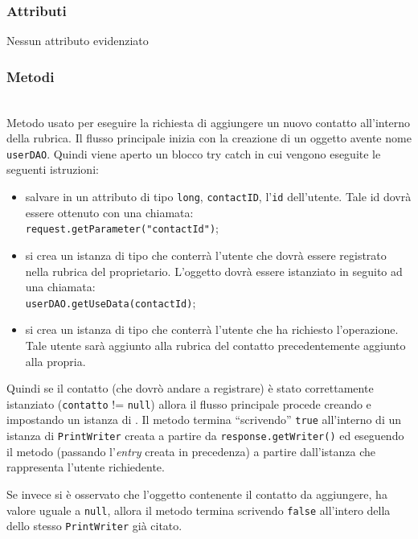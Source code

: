 \subsubsection*{Attributi}

Nessun attributo evidenziato

\subsubsection*{Metodi}
\begin{description}
	\item{}\\	
	Metodo usato per eseguire la richiesta di aggiungere un nuovo contatto all'interno della rubrica. Il flusso principale inizia  con la creazione di un oggetto  avente nome \texttt{userDAO}. Quindi viene aperto un blocco try catch in cui vengono eseguite le seguenti istruzioni:
	\begin{itemize}
		\item salvare in un attributo di tipo \texttt{long}, \texttt{contactID}, l'\texttt{id} dell'utente. Tale id dovrà essere ottenuto con una chiamata:\\
		\verb|request.getParameter("contactId")|;\\
		
		\item si crea un istanza di tipo  che conterrà l'utente che dovrà essere registrato nella rubrica del proprietario. L'oggetto dovrà essere istanziato in seguito ad una chiamata:\\
		\verb|userDAO.getUseData(contactId)|;
		
		\item si crea un istanza di tipo  che conterrà l'utente che ha richiesto l'operazione. Tale utente sarà aggiunto alla rubrica del contatto precedentemente aggiunto alla propria.
	\end{itemize}
	
	Quindi se il contatto (che dovrò andare a registrare) è stato correttamente istanziato (\texttt{contatto} != \texttt{null}) allora il flusso principale procede creando e impostando un istanza di . Il metodo termina ``scrivendo'' \texttt{true} all'interno di un istanza di \texttt{PrintWriter} creata a partire da \texttt{response.getWriter()} ed eseguendo il metodo  (passando l'\textit{entry} creata in precedenza) a partire dall'istanza che rappresenta l'utente richiedente.
	
	Se invece si è osservato che l'oggetto contenente il contatto da aggiungere, ha valore uguale a \texttt{null}, allora il metodo termina scrivendo \texttt{false} all'intero della dello stesso \texttt{PrintWriter} già citato.
\end{description}

